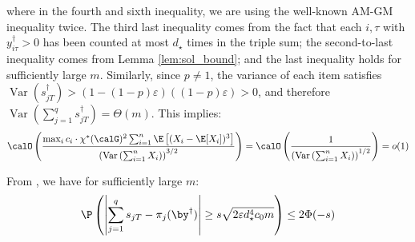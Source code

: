\documentclass[blindrev]{informs3noheader}
\DeclareMathOperator{\Var}{Var}
\begin{document}
where in the fourth and sixth inequality, we are using the well-known AM-GM inequality twice. The third last inequality comes from the fact that each $i,\tau$ with $y^\dagger_{i\tau}>0$ has been counted at most $d_\star$ times in the triple sum; the second-to-last inequality comes from Lemma \ref{lem:sol_bound}; and the last inequality holds for sufficiently large $m$. Similarly, since $p\neq1$, the variance of each item satisfies  $\Var(s^\dagger_{jT})>(1-(1-p)\varepsilon)((1-p)\varepsilon)>0$, and therefore $\Var\left(\sum_{j=1}^q s^\dagger_{jT}\right)=\Theta(m)$. This implies:
\[\calO\left(\frac{\max_{i} c_i \cdot \chi^*(\calG)^2 \sum_{i=1}^n \E\left[(X_i-\E[X_i])^3\right]}{\left(\Var\left(\sum_{i=1}^n X_i\right)\right)^{3/2}}\right)=\calO\left(\frac{1}{\left(\Var\left(\sum_{i=1}^n X_i\right)\right)^{1/2}}\right)=o(1)\]

From \cite{janisch2024berry}, we have for sufficiently large $m$:
\[\P\left(\left|\sum_{j=1}^q s_{jT} - \pi_{j}(\by^\dagger)\right|\geq s\sqrt{2\varepsilon d_\star^4 c_0 m}\right)\leq2\Phi(-s) \]
\end{document}
